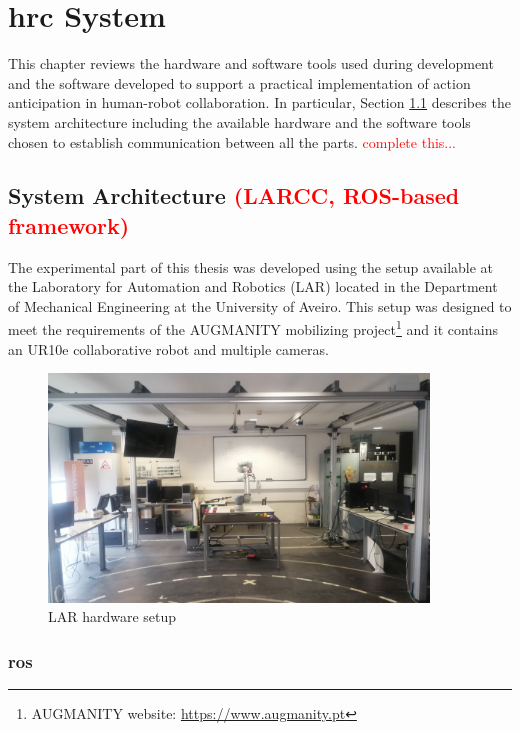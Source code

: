 \chapter{\acl{hrc} System}
\label{chapter:hrc_system}

This chapter reviews the hardware and software tools used during development and the software developed to support a practical implementation of action anticipation in human-robot collaboration. In particular, Section \ref{section:system_architecture} describes the system architecture including the available hardware and the software tools chosen to establish communication between all the parts. \textcolor{red}{complete this...}

\section{System Architecture \textcolor{red}{(LARCC, ROS-based framework)}}
\label{section:system_architecture}

The experimental part of this thesis was developed using the setup available at the Laboratory for Automation and Robotics (LAR) located in the Department of Mechanical Engineering at the University of Aveiro. This setup was designed to meet the requirements of the AUGMANITY mobilizing project\footnote{AUGMANITY website: \url{https://www.augmanity.pt}} and it contains an UR10e collaborative robot and multiple cameras.

\begin{figure}[h]
\centerline{\includegraphics[width=0.9\textwidth, trim={0 5cm 0 0}, clip]{figs/setup2.jpg}}
\caption[setup]{LAR hardware setup}
\label{fig:ur10e}
\end{figure}

\subsection{\acf{ros}}

